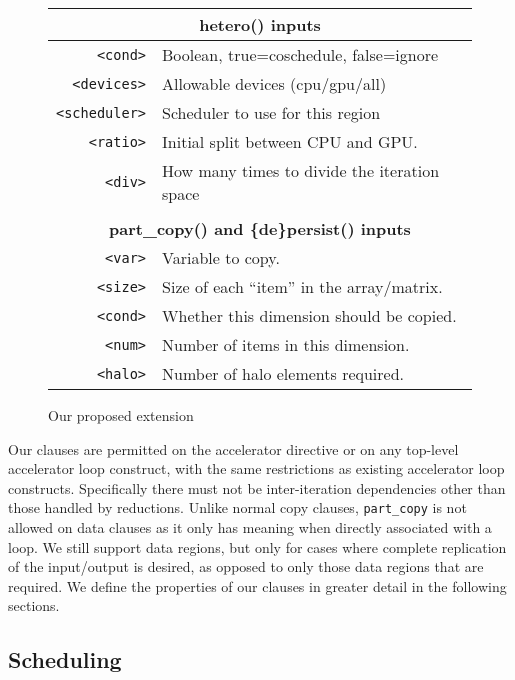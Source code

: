 \begin{figure}[h]
  \centering
  \inputminted[fontsize=\scriptsize,frame=single]{c}{snippets/extension.c}
  {\footnotesize
    \begin{tabular}{rl}
      \\
      \multicolumn{2}{c}{\textbf{hetero() inputs}}\\
      \hline
      \verb#<cond>#& Boolean, true=coschedule, false=ignore\\
      \verb#<devices>#& Allowable devices (cpu/gpu/all)\\
      \verb#<scheduler>#& Scheduler to use for this region\\
      \verb#<ratio>#& Initial split between CPU and GPU.\\
      \verb#<div>#& How many times to divide the iteration space\\
      &\\
      \multicolumn{2}{c}{\textbf{part\_copy() and \{de\}persist() inputs}}\\
      \hline
      \verb#<var>#& Variable to copy.\\
      \verb#<size>#& Size of each ``item'' in the array/matrix.\\
      \verb#<cond>#& Whether this dimension should be copied.\\
      \verb#<num>#& Number of items in this dimension.\\
      \verb#<halo>#& Number of halo elements required.\\
    \end{tabular}
  }
  \caption{Our proposed extension}
  \label{fig:extension}
\end{figure}

Our clauses are permitted on the accelerator directive or on any top-level
accelerator loop construct, with the same restrictions as existing accelerator
loop constructs.  Specifically there must not be inter-iteration dependencies
other than those handled by reductions. Unlike normal copy clauses,
\verb#part_copy# is not allowed on data clauses as it only has meaning when
directly associated with a loop. We still support data regions, but only for
cases where complete replication of the input/output is desired, as opposed to
only those data regions that are required. We define the properties of our
clauses in greater detail in the following sections.


\subsection{Scheduling}
\label{sec:assign}

